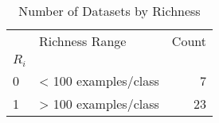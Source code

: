\begin{table}[htbp]
\centering
\caption{Number of Datasets by Richness}
\label{tab:richness_blocking}
\begin{tabular}{llr}
\toprule
 & Richness Range & Count \\
$R_{i}$ &  &  \\
\midrule
0 & < 100 examples/class & 7 \\
1 & > 100 examples/class & 23 \\
\bottomrule
\end{tabular}
\end{table}
